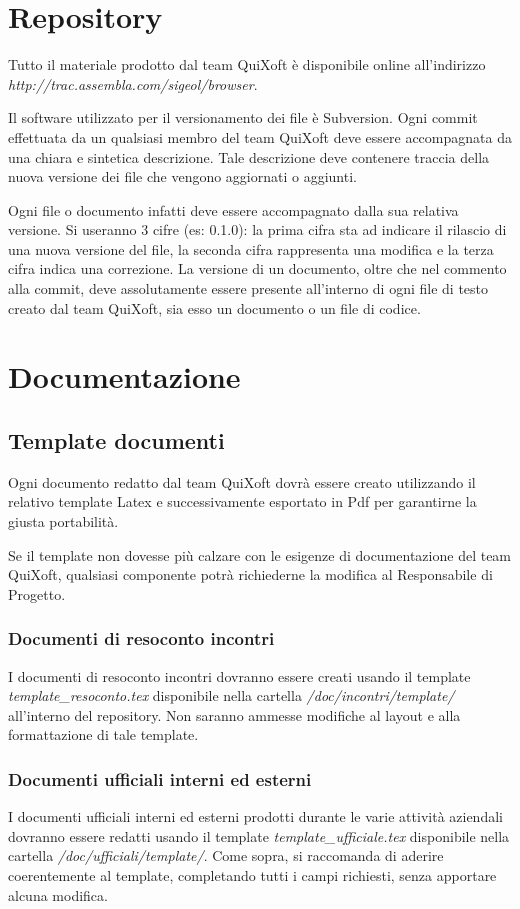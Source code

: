 \documentclass[11pt,a4paper]{article}
\begin{document}
\section{Repository}
Tutto il materiale prodotto dal team QuiXoft è disponibile online all'indirizzo \textit{http://trac.assembla.com/sigeol/browser}.

Il software utilizzato per il versionamento dei file è Subversion.
Ogni commit effettuata da un qualsiasi membro del team QuiXoft deve essere accompagnata da una chiara e sintetica descrizione. Tale descrizione deve contenere traccia della nuova versione dei file che vengono aggiornati o aggiunti.

Ogni file o documento infatti deve essere accompagnato dalla sua relativa versione. Si useranno 3 cifre (es: 0.1.0): la prima cifra sta ad indicare il rilascio di una nuova versione del file, la seconda cifra rappresenta una modifica e la terza cifra indica una correzione. La versione di un documento, oltre che nel commento alla commit, deve assolutamente essere presente all'interno di ogni file di testo creato dal team QuiXoft, sia esso un documento o un file di codice.
\section{Documentazione}
\subsection{Template documenti}
Ogni documento redatto dal team QuiXoft dovrà essere creato utilizzando il relativo template Latex e successivamente esportato in Pdf per garantirne la giusta portabilità.

Se il template non dovesse più calzare con le esigenze di documentazione del team QuiXoft, qualsiasi componente potrà richiederne la modifica al Responsabile di Progetto.
\subsubsection{Documenti di resoconto incontri}
I documenti di resoconto incontri dovranno essere creati usando il template \textit{template\_resoconto.tex} disponibile nella cartella \textit{/doc/incontri/template/} all'interno del repository. Non saranno ammesse modifiche al layout e alla formattazione di tale template.
\subsubsection{Documenti ufficiali interni ed esterni}
I documenti ufficiali interni ed esterni prodotti durante le varie attività aziendali dovranno essere redatti usando il template \textit{template\_ufficiale.tex} disponibile nella cartella \textit{/doc/ufficiali/template/}.
Come sopra, si raccomanda di aderire coerentemente al template, completando tutti i campi richiesti, senza apportare alcuna modifica.
\end{document}
